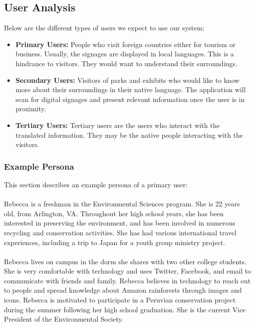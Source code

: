 \documentclass[12pt]{article}
\begin{document}
\subsection{User Analysis}

Below are the different types of users we expect to use our system:

\begin{itemize}

 \item \textbf{Primary Users:} People who visit foreign countries either for tourism or business. Usually, the signages are displayed in local languages. This is a hindrance to visitors. They would want to understand their surroundings.
 
  \item \textbf{Secondary Users:} Visitors of parks and exhibits who would like to know more about their surroundings in their native language. The application will scan for digital signages and present relevant information once the user is in proximity.
  
  \item \textbf{Tertiary Users: } Tertiary users are the users who interact with the translated information. They may be the native people interacting with the visitors. 
  
\end{itemize}

\subsubsection{Example Persona}
\label{persona}

This section describes an example persona of a primary user:

\paragraph{}Rebecca is a freshman in the Environmental Sciences program. She is 22 years old,
from Arlington, VA. Throughout her high school years, she has been interested in preserving the environment, and has been involved in numerous recycling and conservation activities. She has had various international travel experiences, including a trip to Japan for a youth group ministry project.

\paragraph{} Rebecca lives on campus in the dorm she shares with two other college students. She is very comfortable with technology and uses Twitter, Facebook, and email to communicate with friends and family. Rebecca believes in technology to reach out to people and spread knowledge about
Amazon rainforests through images and icons. Rebecca is motivated to participate in a Peruvian conservation project during the summer following her high school graduation. She is the current Vice President of the Environmental Society.
\end{document}
